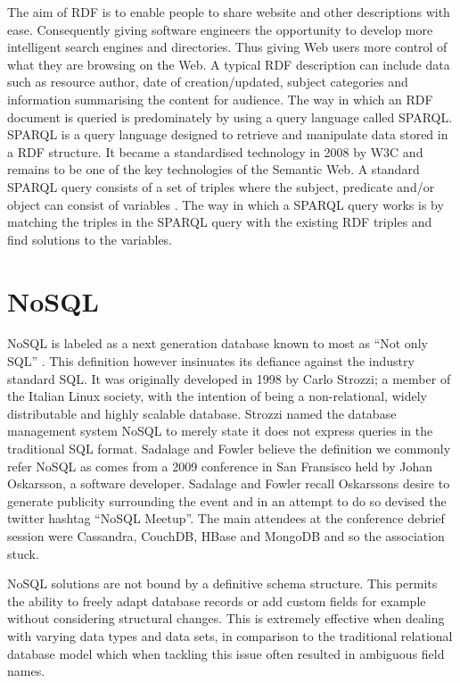 The aim of RDF is to enable people to share website and other descriptions with ease. Consequently giving software engineers the opportunity to develop more intelligent search engines and directories. Thus giving Web users more control of what they are browsing on the Web. A typical RDF description can include data such as resource author, date of creation/updated, subject categories and information summarising the content for audience. The way in which an RDF document is queried is predominately by using a query language called SPARQL. SPARQL is a query language designed to retrieve and manipulate data stored in a RDF structure. It became a standardised technology in 2008 by W3C and remains to be one of the key technologies of the Semantic Web. A standard SPARQL query consists of a set of triples where the subject, predicate and/or object can consist of variables \cite{spa1}. The way in which a SPARQL query works is by matching the triples in the SPARQL query with the existing RDF triples and find solutions to the variables.

\section{NoSQL}\label{nosql}
NoSQL is labeled as a next generation database known to most as ``Not only SQL'' \cite{nosql1}. This definition however insinuates its defiance against the industry standard SQL. It was originally developed in 1998 by Carlo Strozzi; a member of the Italian Linux society, with the intention of being a non-relational, widely distributable and highly scalable database. Strozzi named the database management system NoSQL to merely state it does not express queries in the traditional SQL format. Sadalage and Fowler believe the definition we commonly refer NoSQL as comes from a 2009 conference in San Fransisco held by Johan Oskarsson, a software developer. Sadalage and Fowler recall Oskarssons desire to generate publicity surrounding the event and in an attempt to do so devised the twitter hashtag ``NoSQL Meetup''. The main attendees at the conference debrief session were Cassandra, CouchDB, HBase and MongoDB and so the association stuck. \cite{nosql1}

NoSQL solutions are not bound by a definitive schema structure. This permits the ability to freely adapt database records or add custom fields for example without considering structural changes. This is extremely effective when dealing with varying data types and data sets, in comparison to the traditional relational database model which when tackling this issue often resulted in ambiguous field names.  \cite{nosql1}

